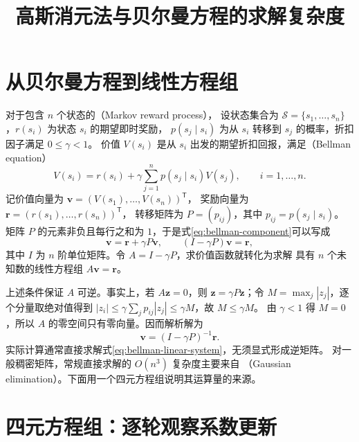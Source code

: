 \documentclass[UTF8,12pt,a4paper,fontset=fandol]{ctexart}
\title{高斯消元法与贝尔曼方程的求解复杂度}
\author{}
\date{}
\begin{document}
\maketitle

\section{从贝尔曼方程到线性方程组}

对于包含 $n$ 个状态的（Markov reward process），
设状态集合为 $\mathcal S=\{s_1,\ldots,s_n\}$，$r(s_i)$ 为状态 $s_i$ 的期望即时奖励，
$p(s_j\mid s_i)$ 为从 $s_i$ 转移到 $s_j$ 的概率，折扣因子满足 $0\leq\gamma<1$。
价值 $V(s_i)$ 是从 $s_i$ 出发的期望折扣回报，满足（Bellman equation）
\begin{equation}
  V(s_i)=r(s_i)+\gamma\sum_{j=1}^{n}p(s_j\mid s_i)V(s_j),
  \qquad i=1,\ldots,n.
  \label{eq:bellman-component}
\end{equation}
记价值向量为 $\boldsymbol v=(V(s_1),\ldots,V(s_n))^{\mathsf T}$，
奖励向量为 $\boldsymbol r=(r(s_1),\ldots,r(s_n))^{\mathsf T}$，
转移矩阵为 $P=(p_{ij})$，其中 $p_{ij}=p(s_j\mid s_i)$。
矩阵 $P$ 的元素非负且每行之和为 $1$，于是式\eqref{eq:bellman-component}可以写成
\begin{equation}
  \boldsymbol v=\boldsymbol r+\gamma P\boldsymbol v,
  \qquad (I-\gamma P)\boldsymbol v=\boldsymbol r,
  \label{eq:bellman-linear-system}
\end{equation}
其中 $I$ 为 $n$ 阶单位矩阵。令 $A=I-\gamma P$，求价值函数就转化为求解
具有 $n$ 个未知数的线性方程组 $A\boldsymbol v=\boldsymbol r$。

上述条件保证 $A$ 可逆。事实上，若 $A\boldsymbol z=0$，则
$\boldsymbol z=\gamma P\boldsymbol z$；令 $M=\max_j|z_j|$，逐个分量取绝对值得到
$|z_i|\leq\gamma\sum_jp_{ij}|z_j|\leq\gamma M$，故 $M\leq\gamma M$。
由 $\gamma<1$ 得 $M=0$，所以 $A$ 的零空间只有零向量。因而解析解为
\begin{equation}
  \boldsymbol v=(I-\gamma P)^{-1}\boldsymbol r.
  \label{eq:bellman-inverse}
\end{equation}
实际计算通常直接求解式\eqref{eq:bellman-linear-system}，无须显式形成逆矩阵。
对一般稠密矩阵，常规直接求解的 $O(n^3)$ 复杂度主要来自
（Gaussian elimination）。下面用一个四元方程组说明其运算量的来源。

\section{四元方程组：逐轮观察系数更新}
\end{document}
